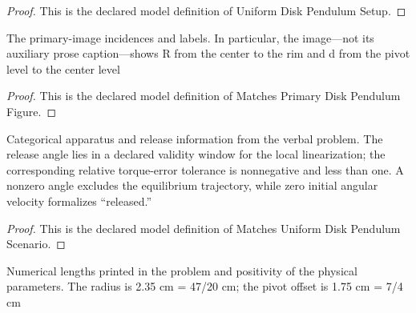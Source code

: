 \begin{proof}
  This is the declared model definition of Uniform Disk Pendulum Setup.
\end{proof}
\begin{definition}
  \label{def:physics:phyx-mini-0264:phyxminiproblems-problemphyxmini0264-matchesprimarydiskpendulumfigure}
  The primary-image incidences and labels. In particular, the image—not its auxiliary prose caption—shows R from the center to the rim and d from the pivot level to the center level
\end{definition}
\begin{proof}
  This is the declared model definition of Matches Primary Disk Pendulum Figure.
\end{proof}
\begin{definition}
  \label{def:physics:phyx-mini-0264:phyxminiproblems-problemphyxmini0264-matchesuniformdiskpendulumscenario}
  Categorical apparatus and release information from the verbal problem. The release angle lies in a declared validity window for the local linearization; the corresponding relative torque-error tolerance is nonnegative and less than one. A nonzero angle excludes the equilibrium trajectory, while zero initial angular velocity formalizes “released.”
\end{definition}
\begin{proof}
  This is the declared model definition of Matches Uniform Disk Pendulum Scenario.
\end{proof}
\begin{definition}
  \label{def:physics:phyx-mini-0264:phyxminiproblems-problemphyxmini0264-hasuniformdiskpendulumproblemdata}
  Numerical lengths printed in the problem and positivity of the physical parameters. The radius is 2.35 cm = 47/20 cm; the pivot offset is 1.75 cm = 7/4 cm
\end{definition}
